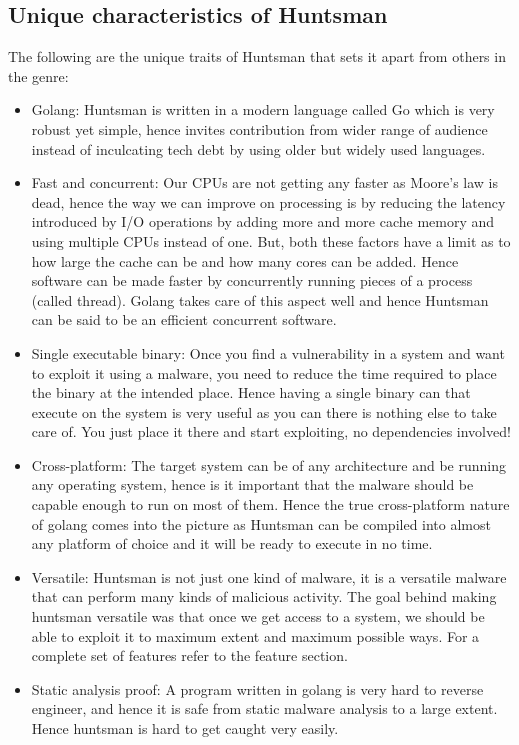 \documentclass[12pt]{article}
\begin{document}
\subsection{Unique characteristics of Huntsman}
The following are the unique traits of Huntsman that sets it apart from others in the genre:
\begin{itemize}
	\item Golang: Huntsman is written in a modern language called Go which is very robust yet simple, hence invites contribution from wider range of audience instead of inculcating tech debt by using older but widely used languages. 
	\item Fast and concurrent: Our CPUs are not getting any faster as Moore’s law is dead, hence the way we can improve on processing is by reducing the latency introduced by I/O operations by adding more and more cache memory and using multiple CPUs instead of one. But, both these factors have a limit as to how large the cache can be and how many cores can be added. Hence software can be made faster by concurrently running pieces of a process (called thread). Golang takes care of this aspect well and hence Huntsman can be said to be an efficient concurrent software.  

	\item Single executable binary: Once you find a vulnerability in a system and want to exploit it using a malware, you need to reduce the time required to place the binary at the intended place. Hence having a single binary can that execute on the system is very useful as you can there is nothing else to take care of. You just place it there and start exploiting, no dependencies involved!

	\item Cross-platform: The target system can be of any architecture and be running any operating system, hence is it important that the malware should be capable enough to run on most of them. Hence the true cross-platform nature of golang comes into the picture as Huntsman can be compiled into almost any platform of choice and it will be ready to execute in no time.

	\item Versatile: Huntsman is not just one kind of malware, it is a versatile malware that can perform many kinds of malicious activity. The goal behind making huntsman versatile was that once we get access to a system, we should be able to exploit it to maximum extent and maximum possible ways. For a complete set of features refer to the feature section.

	\item Static analysis proof: A program written in golang is very hard to reverse engineer, and hence it is safe from static malware analysis to a large extent. Hence huntsman is hard to get caught very easily.  
\end{itemize}
\end{document}
